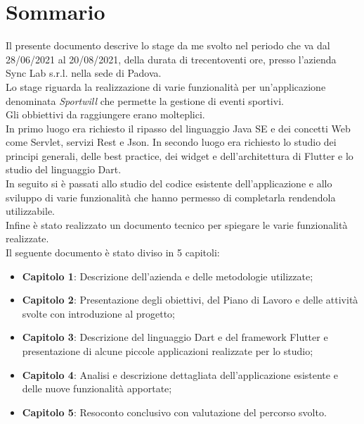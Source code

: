 
\cleardoublepage
{}
{}
\begingroup
\let\clearpage\relax
\let\cleardoublepage\relax
\let\cleardoublepage\relax

\chapter*{Sommario}

Il presente documento descrive lo stage da me svolto nel periodo che va dal 28/06/2021 al 20/08/2021, della durata di trecentoventi ore, presso l'azienda Sync Lab s.r.l. nella sede di Padova.\\
Lo stage riguarda la realizzazione di varie funzionalità per un'applicazione denominata \textit{Sportwill} che permette la gestione di eventi sportivi.\\
Gli obbiettivi da raggiungere erano molteplici.\\
In primo luogo era richiesto il ripasso del linguaggio Java SE e dei concetti Web come Servlet, servizi Rest e Json.
In secondo luogo era richiesto lo studio dei principi generali, delle best practice, dei widget e dell'architettura di Flutter e lo studio del linguaggio Dart.\\
In seguito si è passati allo studio del codice esistente dell'applicazione e allo sviluppo di varie funzionalità che hanno permesso di completarla rendendola utilizzabile.\\
Infine è stato realizzato un documento tecnico per spiegare le varie funzionalità realizzate.\\
Il seguente documento è stato diviso in 5 capitoli:
\begin{itemize}
	\item \textbf{Capitolo 1}: Descrizione dell'azienda e delle metodologie utilizzate; \\
	\item \textbf{Capitolo 2}: Presentazione degli obiettivi, del Piano di Lavoro e delle attività svolte con introduzione al progetto; \\
	\item \textbf{Capitolo 3}: Descrizione del linguaggio Dart e del framework Flutter e presentazione di alcune piccole applicazioni realizzate per lo studio; \\
	\item \textbf{Capitolo 4}: Analisi e descrizione dettagliata dell'applicazione esistente e delle nuove funzionalità apportate; \\
	\item \textbf{Capitolo 5}: Resoconto conclusivo con valutazione del percorso svolto. \\
\end{itemize}

%
%

\endgroup			

\vfill

